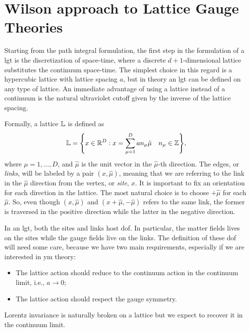 \section{Wilson approach to Lattice Gauge Theories}
\label{sec:wilson_approach_to_lft}

Starting from the path integral formulation, the first step in the formulation of a \ac{lgt} is the discretization of space-time, where a discrete $d+1$-dimensional lattice substitutes the continuum space-time.
The simplest choice in this regard is a hypercubic lattice with lattice spacing $a$, but in theory an \ac{lgt} can be defined on any type of lattice.
An immediate advantage of using a lattice instead of a continuum is the natural ultraviolet cutoff given by the inverse of the lattice spacing.

Formally, a lattice $\mathbb{L}$ is defined as
\begin{equation}
    \mathbb{L} = \qty{
        x \in \mathbb{R}^{D} :
        x = \sum_{\mu = 1}^{D} a n_{\mu} \hat{\mu} \quad
        n_{\mu} \in \mathbb{Z}},
\end{equation}
where $\mu = 1, \dots, D$, and $\hat{\mu}$ is the unit vector in the $\hat{\mu}$-th direction.
The edges, or \emph{links}, will be labeled by a pair $(x,\hat{\mu})$, meaning that we are referring to the link in the $\hat{\mu}$ direction from the vertex, or \emph{site}, $x$.
It is important to fix an orientation for each direction in the lattice.
The most natural choice is to choose $+ \hat{\mu}$ for each $\hat{\mu}$.
So, even though $(x,\hat{\mu})$ and $(x + \hat{\mu}, - \hat{\mu})$ refers to the same link, the former is traversed in the positive direction while the latter in the negative direction.

In an \ac{lgt}, both the sites and links host \ac{dof}.
In particular, the matter fields lives on the sites while the gauge fields live on the links.
The definition of these \ac{dof} will need some care, because we have two main requirements, especially if we are interested in \ac{ym} theory:
\begin{itemize}
    \item The lattice action should reduce to the continuum action in the continuum limit, i.e., $a \to 0$;
    \item The lattice action should respect the gauge symmetry.
\end{itemize}
Lorentz invariance is naturally broken on a lattice but we expect to recover it in the continuum limit.

